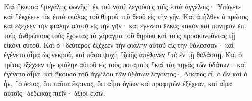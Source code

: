 \documentclass{openreader}
\begin{document}
Καὶ ἤκουσα ⸂μεγάλης φωνῆς⸃ ἐκ τοῦ ναοῦ λεγούσης τοῖς ἑπτὰ ἀγγέλοις· Ὑπάγετε καὶ ⸀ἐκχέετε τὰς ἑπτὰ φιάλας τοῦ θυμοῦ τοῦ θεοῦ εἰς τὴν γῆν. 
Καὶ ἀπῆλθεν ὁ πρῶτος καὶ ἐξέχεεν τὴν φιάλην αὐτοῦ εἰς τὴν γῆν· καὶ ἐγένετο ἕλκος κακὸν καὶ πονηρὸν ἐπὶ τοὺς ἀνθρώπους τοὺς ἔχοντας τὸ χάραγμα τοῦ θηρίου καὶ τοὺς προσκυνοῦντας τῇ εἰκόνι αὐτοῦ. 
Καὶ ὁ ⸀δεύτερος ἐξέχεεν τὴν φιάλην αὐτοῦ εἰς τὴν θάλασσαν· καὶ ἐγένετο αἷμα ὡς νεκροῦ, καὶ πᾶσα ψυχὴ ⸀ζωῆς ἀπέθανεν ⸀τὰ ἐν τῇ θαλάσσῃ. 
Καὶ ὁ τρίτος ἐξέχεεν τὴν φιάλην αὐτοῦ εἰς τοὺς ποταμοὺς ⸀καὶ τὰς πηγὰς τῶν ὑδάτων· καὶ ἐγένετο αἷμα. 
καὶ ἤκουσα τοῦ ἀγγέλου τῶν ὑδάτων λέγοντος· Δίκαιος εἶ, ὁ ὢν καὶ ὁ ἦν, ⸀ὁ ὅσιος, ὅτι ταῦτα ἔκρινας, 
ὅτι αἷμα ἁγίων καὶ προφητῶν ἐξέχεαν, καὶ αἷμα αὐτοῖς ⸀δέδωκας πιεῖν· ἄξιοί εἰσιν. 
\end{document}

